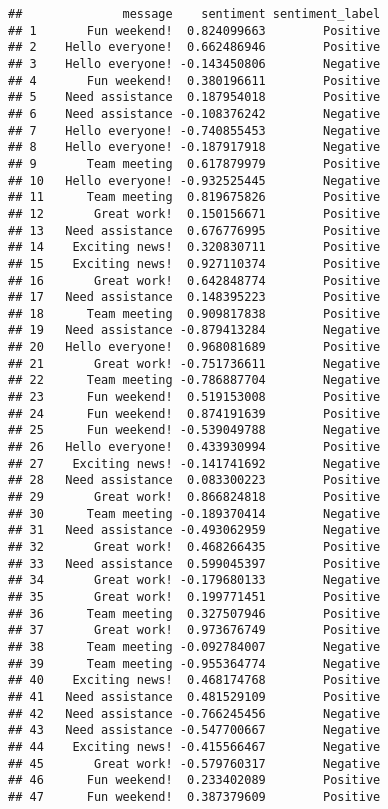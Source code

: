 \documentclass[
]{article}
\begin{document}
\begin{verbatim}
##              message    sentiment sentiment_label
## 1       Fun weekend!  0.824099663        Positive
## 2    Hello everyone!  0.662486946        Positive
## 3    Hello everyone! -0.143450806        Negative
## 4       Fun weekend!  0.380196611        Positive
## 5    Need assistance  0.187954018        Positive
## 6    Need assistance -0.108376242        Negative
## 7    Hello everyone! -0.740855453        Negative
## 8    Hello everyone! -0.187917918        Negative
## 9       Team meeting  0.617879979        Positive
## 10   Hello everyone! -0.932525445        Negative
## 11      Team meeting  0.819675826        Positive
## 12       Great work!  0.150156671        Positive
## 13   Need assistance  0.676776995        Positive
## 14    Exciting news!  0.320830711        Positive
## 15    Exciting news!  0.927110374        Positive
## 16       Great work!  0.642848774        Positive
## 17   Need assistance  0.148395223        Positive
## 18      Team meeting  0.909817838        Positive
## 19   Need assistance -0.879413284        Negative
## 20   Hello everyone!  0.968081689        Positive
## 21       Great work! -0.751736611        Negative
## 22      Team meeting -0.786887704        Negative
## 23      Fun weekend!  0.519153008        Positive
## 24      Fun weekend!  0.874191639        Positive
## 25      Fun weekend! -0.539049788        Negative
## 26   Hello everyone!  0.433930994        Positive
## 27    Exciting news! -0.141741692        Negative
## 28   Need assistance  0.083300223        Positive
## 29       Great work!  0.866824818        Positive
## 30      Team meeting -0.189370414        Negative
## 31   Need assistance -0.493062959        Negative
## 32       Great work!  0.468266435        Positive
## 33   Need assistance  0.599045397        Positive
## 34       Great work! -0.179680133        Negative
## 35       Great work!  0.199771451        Positive
## 36      Team meeting  0.327507946        Positive
## 37       Great work!  0.973676749        Positive
## 38      Team meeting -0.092784007        Negative
## 39      Team meeting -0.955364774        Negative
## 40    Exciting news!  0.468174768        Positive
## 41   Need assistance  0.481529109        Positive
## 42   Need assistance -0.766245456        Negative
## 43   Need assistance -0.547700667        Negative
## 44    Exciting news! -0.415566467        Negative
## 45       Great work! -0.579760317        Negative
## 46      Fun weekend!  0.233402089        Positive
## 47      Fun weekend!  0.387379609        Positive

\end{verbatim}
\end{document}
